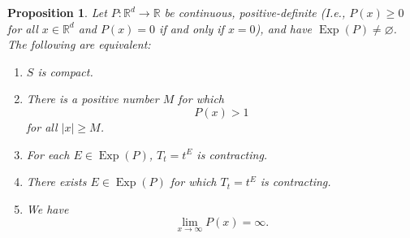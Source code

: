 \documentclass[11pt]{article}
\theoremstyle{theorem}
\newtheorem{proposition}[theorem]{Proposition}
\newcommand\Exp{\operatorname{Exp}}
\begin{document}
\begin{proposition}\label{prop:PositiveHomogeneousCharacterization}
Let $P:\mathbb{R}^d\to\mathbb{R}$ be continuous, positive-definite (I.e., $P(x)\geq 0$ for all $x\in\mathbb{R}^d$ and $P(x)=0$ if and only if $x=0$), and have $\Exp(P)\neq \varnothing$. The following are equivalent:
\begin{enumerate}[label=(\alph*), ref=(\alph*)]
\item\label{cond:SisCompact} $S$ is compact.
\item\label{cond:PisAboveOne} There is a positive number $M$ for which
\begin{equation*}
P(x)>1
\end{equation*}
for all $|x|\geq M$. 
\item\label{cond:Contracting} For each $E\in\Exp(P)$, $T_t=t^E$ is contracting.
\item\label{cond:ThereExistsContracting} There exists $E\in\Exp(P)$ for which $T_t=t^E$ is contracting.
\item\label{cond:InfiniteLimit} We have
\begin{equation*}
\lim_{x\to\infty}P(x)=\infty.
\end{equation*}
\end{enumerate}
\end{proposition}
\end{document}
